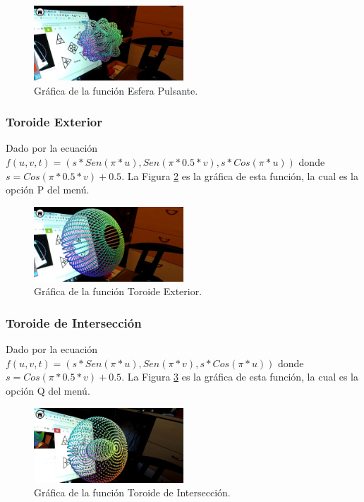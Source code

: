 \begin{figure}[hbt!]
\centering
\includegraphics[width=0.5\textwidth]{figuras/graficas/esfera_pulsante.png}
\caption{\label{fig:graf_esfera_pulsante}Gráfica de la función Esfera Pulsante.}
\end{figure}
\FloatBarrier

\subsubsection{Toroide Exterior}
Dado por la ecuación $f(u,v,t)=(s*Sen(\pi * u), Sen(\pi * 0.5 * v), s*Cos(\pi * u))$ donde $s = Cos(\pi * 0.5 * v) + 0.5$. La Figura \ref{fig:graf_toroide_exterior} es la gráfica de esta función, la cual es la opción P del menú.

\begin{figure}[hbt!]
\centering
\includegraphics[width=0.5\textwidth]{figuras/graficas/toroide_exterior.png}
\caption{\label{fig:graf_toroide_exterior}Gráfica de la función Toroide Exterior.}
\end{figure}
\FloatBarrier

\subsubsection{Toroide de Intersección}
Dado por la ecuación $f(u,v,t)=(s*Sen(\pi * u), Sen(\pi *  v), s*Cos(\pi * u))$ donde $s = Cos(\pi * 0.5 * v) + 0.5$. La Figura \ref{fig:graf_toroide_interseccion} es la gráfica de esta función, la cual es la opción Q del menú.

\begin{figure}[hbt!]
\centering
\includegraphics[width=0.5\textwidth]{figuras/graficas/toroide_interseccion.png}
\caption{\label{fig:graf_toroide_interseccion}Gráfica de la función Toroide de Intersección.}
\end{figure}
\FloatBarrier

